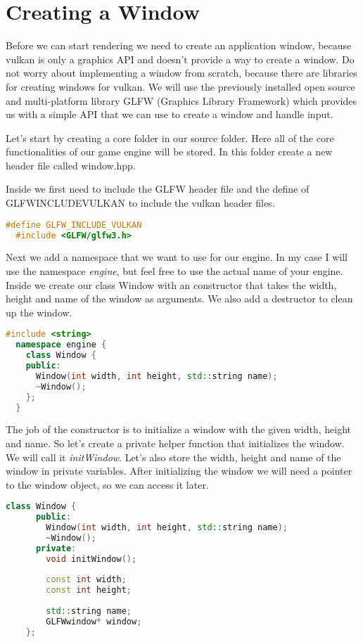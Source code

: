 \documentclass[12pt]{report} \usepackage{preamble}
\begin{document}
\section{Creating a Window}

Before we can start rendering we need to create an application window,
because vulkan is only a graphics API and doesn't provide a way to create a window.
Do not worry about implementing a window from scratch,
because there are libraries for creating windows for vulkan. We will use the
previously installed open source and multi-platform library GLFW (Graphics Library Framework)
which provides us with a simple API that we can use to create a window and handle input. \cite{glfw}

Let's start by creating a core folder in our source folder. Here all of the core functionalities
of our game engine will be stored. In this folder create a new header file called window.hpp.

Inside we first need to include the GLFW header file and the define of \\
GLFW\textunderscore INCLUDE\textunderscore VULKAN to include the vulkan header files.

\begin{lstlisting}[language=C++]
  #define GLFW_INCLUDE_VULKAN
  #include <GLFW/glfw3.h>
\end{lstlisting}

Next we add a namespace that we want to use for our engine. In my case I will use
the namespace \textit{engine}, but feel free to use the actual name of your engine.
Inside we create our class Window with an constructor that takes the width, height
and name of the window as arguments. We also add a destructor to clean up the window.

\begin{lstlisting}[language=C++]
  #include <string>
  namespace engine {
    class Window {
    public:
      Window(int width, int height, std::string name);
      ~Window();
    };
  }
\end{lstlisting}

The job of the constructor is to initialize a window with the given width, height and name.
So let's create a private helper function that initializes the window. We will call it
\textit{initWindow}. Let's also store the width, height and name of the window in private variables.
After initializing the window we will need a pointer to the window object, so we can access it later.

\begin{lstlisting}[language=C++]
  class Window {
      public:
        Window(int width, int height, std::string name);
        ~Window();
      private:
        void initWindow();
      
        const int width;
        const int height;
      
        std::string name;
        GLFWwindow* window;
    };
\end{lstlisting}
\end{document}
